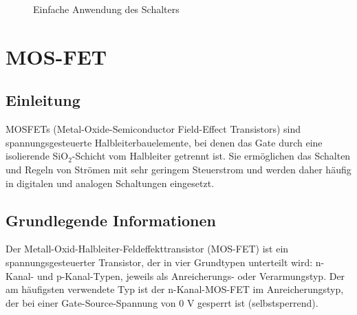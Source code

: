 \begin{figure}[H]
	\centering
	\caption{Einfache Anwendung des Schalters}
	\label{anwendungSchalter}
\end{figure}


\section{MOS-FET}
\subsection{Einleitung}
MOSFETs (Metal-Oxide-Semiconductor Field-Effect Transistors) sind spannungsgesteuerte Halbleiterbauelemente, bei denen das Gate durch eine isolierende SiO$_2$-Schicht vom Halbleiter getrennt ist. Sie ermöglichen das Schalten und Regeln von Strömen mit sehr geringem Steuerstrom und werden daher häufig in digitalen und analogen Schaltungen eingesetzt. \cite{Alles2024}
\subsection{Grundlegende Informationen}
Der Metall-Oxid-Halbleiter-Feldeffekttransistor (MOS-FET) ist ein spannungsgesteuerter Transistor, der in vier Grundtypen unterteilt wird: n-Kanal- und p-Kanal-Typen, jeweils als Anreicherungs- oder Verarmungstyp. Der am häufigsten verwendete Typ ist der n-Kanal-MOS-FET im Anreicherungstyp, der bei einer Gate-Source-Spannung von 0 V gesperrt ist (selbstsperrend).\cite{Alles2024}

